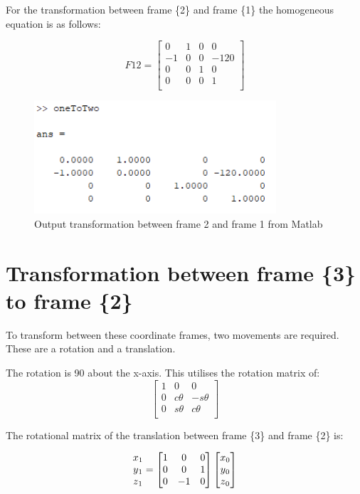 \documentclass [11pt]{report}
\begin{document}
For the transformation between frame \{2\} and frame \{1\} the homogeneous equation is as follows: 

\begin{equation*}
F12
= 
\begin{bmatrix}
0&1&0&0\\
-1&0&0&-120\\
0&0&1&0\\
0&0&0&1\\
\end{bmatrix}
\end{equation*}

\begin{figure}[H]
\centerline{\includegraphics[width=9cm]{oneToTwooutput.png}}
\caption{Output transformation between frame 2 and frame 1 from Matlab}
\label{fig}
\end{figure}

\section{Transformation between frame \{3\}\, to frame \{2\}}

To transform between these coordinate frames, two movements are required. These are a rotation and a translation. 

The rotation is 90{\degree} about the x-axis. This utilises the rotation matrix of: 
$$
\begin{bmatrix}
1&0&0\\
0&c{\theta}&-s{\theta}\\
0&s{\theta}&c{\theta}\\
\end{bmatrix}
$$

The rotational matrix of the translation between frame \{3\} and frame \{2\} is:

\begin{equation*}
\begin{matrix}
x\textsubscript{1}\\
y\textsubscript{1}\\
z\textsubscript{1}\\
\end{matrix}
= 
\begin{bmatrix}
1&0&0\\
0&0&1\\
0&-1&0\\
\end{bmatrix}
\begin{bmatrix}
x\textsubscript{0}\\
y\textsubscript{0}\\
z\textsubscript{0}\\
\end{bmatrix}
\end{equation*}
\end{document}
